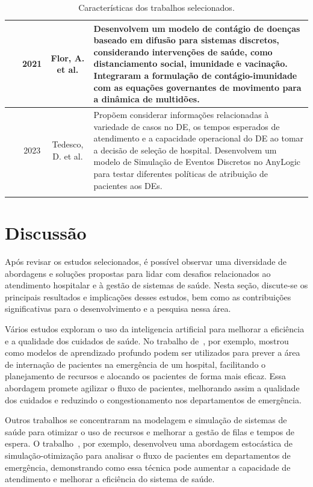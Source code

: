 \begin{longtable}{ |c|c|c|p{8.5cm}| }
 \hline
 ~\cite{10.1145/3487983.3488298} & 2021 & Flor, A. et al. & Desenvolvem um modelo de contágio de doenças baseado em difusão para sistemas discretos, considerando intervenções de saúde, como distanciamento social, imunidade e vacinação. Integraram a formulação de contágio-imunidade com as equações governantes de movimento para a dinâmica de multidões.\\
 \hline
 ~\cite{10.1145/3587889.3587893} & 2023 & Tedesco, D. et al. & Propõem considerar informações relacionadas à variedade de casos no DE, os tempos esperados de atendimento e a capacidade operacional do DE ao tomar a decisão de seleção de hospital. Desenvolvem um modelo de Simulação de Eventos Discretos no AnyLogic para testar diferentes políticas de atribuição de pacientes aos DEs.\\
 \hline
\caption{Características dos trabalhos selecionados.}
\label{table:3}
\end{longtable}

\section{\label{sec:trabalhos_discussao}Discussão}
Após revisar os estudos selecionados, é possível observar uma diversidade de abordagens e soluções propostas para lidar com desafios relacionados ao atendimento hospitalar e à gestão de sistemas de saúde. Nesta seção, discute-se os principais resultados e implicações desses estudos, bem como as contribuições significativas para o desenvolvimento e a pesquisa nessa área.

Vários estudos exploram o uso da inteligencia artificial para melhorar a eficiência e a qualidade dos cuidados de saúde. No trabalho de~\cite{9103941}, por exemplo, mostrou como modelos de aprendizado profundo podem ser utilizados para prever a área de internação de pacientes na emergência de um hospital, facilitando o planejamento de recursos e alocando os pacientes de forma mais eficaz. Essa abordagem promete agilizar o fluxo de pacientes, melhorando assim a qualidade dos cuidados e reduzindo o congestionamento nos departamentos de emergência.

Outros trabalhos se concentraram na modelagem e simulação de sistemas de saúde para otimizar o uso de recursos e melhorar a gestão de filas e tempos de espera. O trabalho~\cite{9481128}, por exemplo, desenvolveu uma abordagem estocástica de simulação-otimização para analisar o fluxo de pacientes em departamentos de emergência, demonstrando como essa técnica pode aumentar a capacidade de atendimento e melhorar a eficiência do sistema de saúde.

